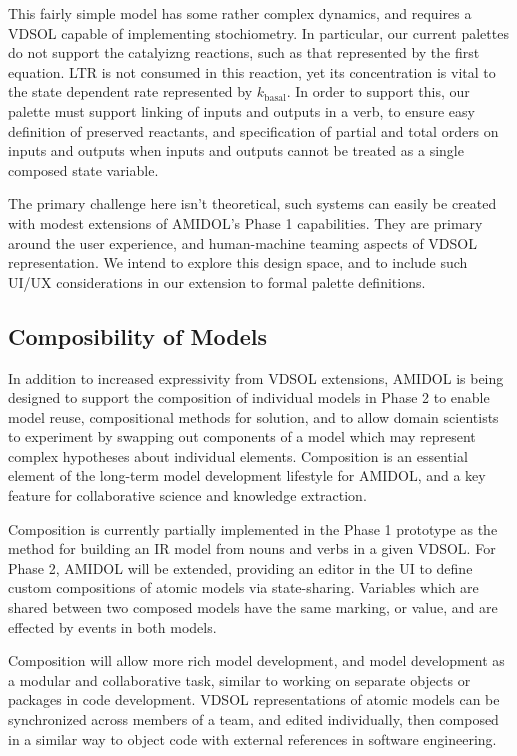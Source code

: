 \documentclass[11pt]{article}
\newcommand{\amidol}{\textsc{AMIDOL}}
\begin{document}
This fairly simple model has some rather complex dynamics, and
requires a VDSOL capable of implementing stochiometry.  In particular,
our current palettes do not support the catalyizng reactions, such as
that represented by the first equation.  LTR is not consumed in this
reaction, yet its concentration is vital to the state dependent rate
represented by $k_{\mathrm{basal}}$.  In order to support this, our
palette must support linking of inputs and outputs in a verb, to
ensure easy definition of preserved reactants, and specification of
partial and total orders on inputs and outputs when inputs and outputs
cannot be treated as a single composed state variable.

The primary challenge here isn't theoretical, such systems can easily
be created with modest extensions of \amidol{}'s Phase 1
capabilities.  They are primary around the user experience, and
human-machine teaming aspects of VDSOL representation.  We intend to
explore this design space, and to include such UI/UX considerations in
our extension to formal palette definitions.

\subsection{Composibility of Models}

In addition to increased expressivity from VDSOL extensions, \amidol{}
is being designed to support the composition of individual models in
Phase 2 to enable model reuse, compositional methods for solution, and
to allow domain scientists to experiment by
swapping out components of a model which may represent complex
hypotheses about individual elements.  Composition is an essential
element of the long-term model development lifestyle for \amidol{},
and a key feature for collaborative science and knowledge extraction.

Composition is currently partially implemented in the Phase 1
prototype as the method for building an IR model from nouns and verbs
in a given VDSOL.  For Phase 2, \amidol{} will be extended, providing
an editor in the UI to define custom compositions of atomic models via
state-sharing.  Variables which are shared between two composed models
have the same marking, or value, and are effected by events in both
models.

Composition will allow more rich model development, and model
development as a modular and collaborative task, similar to working on
separate objects or packages in code development.  VDSOL
representations of atomic models can be synchronized across members of
a team, and edited individually, then composed in a similar way to
object code with external references in software engineering.
\end{document}
